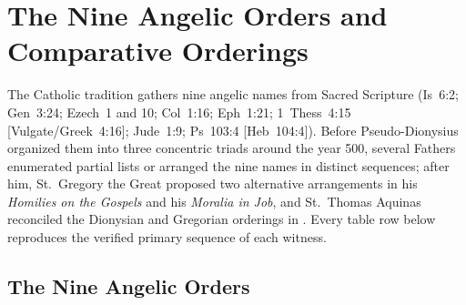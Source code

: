 \section{The Nine Angelic Orders and Comparative Orderings}
\label{app:orders}

The Catholic tradition gathers nine angelic names from Sacred Scripture (Is~6:2; Gen~3:24; Ezech~1 and 10; Col~1:16; Eph~1:21; 1~Thess~4:15 [Vulgate/Greek~4:16]; Jude~1:9; Ps~103:4 [Heb~104:4]). Before Pseudo-Dionysius organized them into three concentric triads around the year 500, several Fathers enumerated partial lists or arranged the nine names in distinct sequences; after him, St.~Gregory the Great proposed two alternative arrangements in his \emph{Homilies on the Gospels} and his \emph{Moralia in Job}, and St.~Thomas Aquinas reconciled the Dionysian and Gregorian orderings in . Every table row below reproduces the verified primary sequence of each witness.

\subsection{The Nine Angelic Orders}

